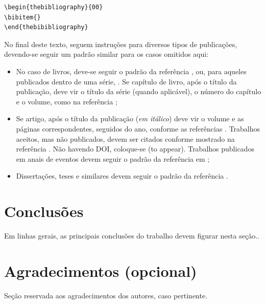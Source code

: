 \documentclass[a4,11pt]{pssbmac}
\begin{document}
\begin{verbatim}
\begin{thebibliography}{00}
\bibitem{}
\end{thebibibliography}
\end{verbatim}

No final deste texto, seguem instruções para diversos tipos de publicações, devendo-se seguir um padrão similar para os casos omitidos aqui:

\begin{itemize}
\item No caso de livros, deve-se seguir o padrão da referência \cite{Boldrini}, ou, para aqueles publicados dentro de uma série, \cite{Gomes}. Se capítulo de livro, após o título da publicação,  deve vir o título da série (quando aplicável), o número do capítulo e o volume, como na referência \cite{daSilva};
\item Se artigo, após o título da publicação ({\it em itálico}) deve vir o volume e as páginas correspondentes, seguidos do ano, conforme as referências \cite{Diniz2}. Trabalhos aceitos, mas não publicados, devem ser citados conforme mostrado na referência \cite{Cuminato}. Não havendo DOI, coloque-se (to appear). Trabalhos publicados em anais de eventos devem seguir o padrão da referência em \cite{Santos};
\item Dissertações, teses e similares devem seguir o padrão da referência \cite{Diniz1}.
\end{itemize}

\section{Conclusões}
Em linhas gerais, as principais conclusões do trabalho devem figurar nesta seção.. 

\section*{Agradecimentos (opcional)}
Seção reservada aos agradecimentos dos autores, caso pertinente.
\end{document}
